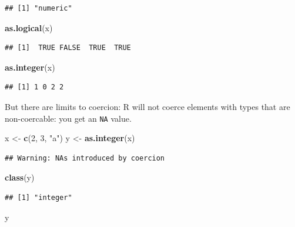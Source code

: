 \documentclass[]{book}
\newenvironment{Shaded}{\begin{snugshade}}{\end{snugshade}}
\newcommand{\DecValTok}[1]{\textcolor[rgb]{0.00,0.00,0.81}{#1}}
\newcommand{\KeywordTok}[1]{\textcolor[rgb]{0.13,0.29,0.53}{\textbf{#1}}}
\newcommand{\NormalTok}[1]{#1}
\newcommand{\StringTok}[1]{\textcolor[rgb]{0.31,0.60,0.02}{#1}}
\begin{document}
\begin{verbatim}
## [1] "numeric"
\end{verbatim}

\begin{Shaded}
\begin{Highlighting}[]
\KeywordTok{as.logical}\NormalTok{(x)}
\end{Highlighting}
\end{Shaded}

\begin{verbatim}
## [1]  TRUE FALSE  TRUE  TRUE
\end{verbatim}

\begin{Shaded}
\begin{Highlighting}[]
\KeywordTok{as.integer}\NormalTok{(x)}
\end{Highlighting}
\end{Shaded}

\begin{verbatim}
## [1] 1 0 2 2
\end{verbatim}

But there are limits to coercion: R will not coerce elements with types that are non-coercable: you get an \texttt{NA} value.

\begin{Shaded}
\begin{Highlighting}[]
\NormalTok{x <-}\StringTok{ }\KeywordTok{c}\NormalTok{(}\DecValTok{2}\NormalTok{, }\DecValTok{3}\NormalTok{, }\StringTok{"a"}\NormalTok{)}
\NormalTok{y <-}\StringTok{ }\KeywordTok{as.integer}\NormalTok{(x)}
\end{Highlighting}
\end{Shaded}

\begin{verbatim}
## Warning: NAs introduced by coercion
\end{verbatim}

\begin{Shaded}
\begin{Highlighting}[]
\KeywordTok{class}\NormalTok{(y)}
\end{Highlighting}
\end{Shaded}

\begin{verbatim}
## [1] "integer"
\end{verbatim}

\begin{Shaded}
\begin{Highlighting}[]
\NormalTok{y}
\end{Highlighting}
\end{Shaded}
\end{document}
